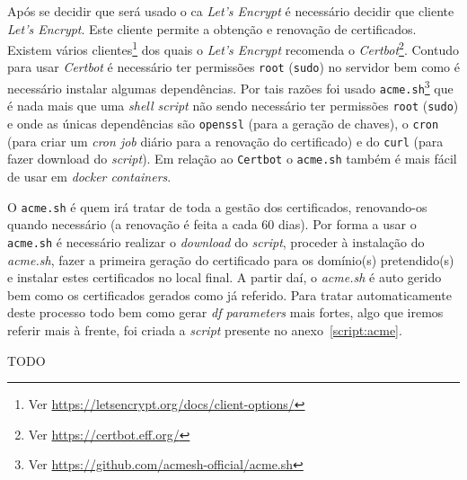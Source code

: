 Após se decidir que será usado o \acrshort{ca} \textit{Let's Encrypt} é necessário decidir que cliente \textit{Let's Encrypt}. Este cliente permite a obtenção e renovação de certificados. Existem vários clientes\footnote{Ver \url{https://letsencrypt.org/docs/client-options/}} dos quais o \textit{Let's Encrypt} recomenda o \textit{Certbot}\footnote{Ver \url{https://certbot.eff.org/}}. Contudo para usar \textit{Certbot} é necessário ter permissões \texttt{root} (\texttt{sudo}) no servidor bem como é necessário instalar algumas dependências. Por tais razões foi usado \texttt{acme.sh}\footnote{Ver \url{https://github.com/acmesh-official/acme.sh}} que é nada mais que uma \textit{shell script} não sendo necessário ter permissões \texttt{root} (\texttt{sudo}) e onde as únicas dependências são \texttt{openssl} (para a geração de chaves), o \texttt{cron} (para criar um \textit{cron job} diário para a renovação do certificado) e do \texttt{curl} (para fazer download do \textit{script}). Em relação ao \texttt{Certbot} o \texttt{acme.sh} também é mais fácil de usar em \textit{docker containers}.

O \texttt{acme.sh} é quem irá tratar de toda a gestão dos certificados, renovando-os quando necessário (a renovação é feita a cada 60 dias).
Por forma a usar o \texttt{acme.sh} é necessário realizar o \textit{download} do \textit{script}, proceder à instalação do \textit{acme.sh}, fazer a primeira geração do certificado para os domínio(s) pretendido(s) e instalar estes certificados no local final. A partir daí, o \textit{acme.sh} é auto gerido bem como os certificados gerados como já referido. Para tratar automaticamente deste processo todo bem como gerar \textit{\acrshort{df} parameters} mais fortes, algo que iremos referir mais à frente, foi criada a \textit{script} presente no anexo~\ref{script:acme}.

TODO
